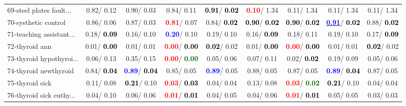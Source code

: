\begin{table}[h]
\begin{center}
\begin{tabular}{lc|c|c|c|c|c|c|c}
69-steel plates fault... &   0.82/  0.12 &   0.90/  0.03 &   0.84/  0.11 & \textcolor{black}{\textbf{  0.91}}/\textcolor{black}{\textbf{  0.02}} & \textcolor{red}{\textbf{  0.10}}/  1.34 &   0.11/  1.34 &   0.11/  1.34 &   0.11/  1.34 \\
70-systhetic control &   0.86/  0.06 &   0.87/  0.03 & \textcolor{red}{\textbf{  0.81}}/  0.07 &   0.84/\textcolor{black}{\textbf{  0.02}} & \textcolor{black}{\textbf{  0.90}}/\textcolor{black}{\textbf{  0.02}} & \textcolor{black}{\textbf{  0.90}}/\textcolor{black}{\textbf{  0.02}} & \underline{\textcolor{blue}{\textbf{  0.91}}}/\textcolor{black}{\textbf{  0.02}} &   0.88/\textcolor{black}{\textbf{  0.02}} \\
71-teaching assistant... &   0.18/\textcolor{black}{\textbf{  0.09}} &   0.16/  0.10 & \textcolor{blue}{\textbf{  0.20}}/  0.10 &   0.19/  0.10 &   0.16/\textcolor{black}{\textbf{  0.09}} &   0.18/  0.11 &   0.19/  0.10 &   0.17/\textcolor{black}{\textbf{  0.09}} \\ \hline
72-thyroid ann &   0.01/\textcolor{black}{\textbf{  0.00}} &   0.01/  0.01 & \textcolor{red}{\textbf{  0.00}}/\textcolor{black}{\textbf{  0.00}} & \textcolor{black}{\textbf{  0.02}}/  0.02 &   0.01/\textcolor{black}{\textbf{  0.00}} & \textcolor{red}{\textbf{  0.00}}/\textcolor{black}{\textbf{  0.00}} &   0.01/  0.01 & \textcolor{black}{\textbf{  0.02}}/  0.02 \\
73-thyroid hypothyroi... &   0.06/  0.13 &   0.35/  0.15 & \textcolor{red}{\textbf{  0.00}}/\textcolor{darkgreen}{\textbf{  0.00}} &   0.05/  0.06 &   0.07/  0.11 &   0.02/\textcolor{black}{\textbf{  0.02}} &   0.19/  0.09 &   0.05/  0.06 \\
74-thyroid newthyroid &   0.84/\textcolor{black}{\textbf{  0.04}} & \textcolor{blue}{\textbf{  0.89}}/\textcolor{black}{\textbf{  0.04}} &   0.85/  0.05 & \textcolor{blue}{\textbf{  0.89}}/  0.05 &   0.88/  0.05 &   0.87/  0.05 & \textcolor{blue}{\textbf{  0.89}}/\textcolor{black}{\textbf{  0.04}} &   0.87/  0.05 \\
75-thyroid sick &   0.11/  0.08 & \textcolor{black}{\textbf{  0.21}}/  0.10 & \textcolor{red}{\textbf{  0.03}}/\textcolor{black}{\textbf{  0.03}} &   0.04/  0.04 &   0.13/  0.08 & \textcolor{red}{\textbf{  0.03}}/\textcolor{darkgreen}{\textbf{  0.02}} & \textcolor{black}{\textbf{  0.21}}/  0.10 &   0.04/  0.04 \\
76-thyroid sick euthy... &   0.04/  0.10 &   0.06/  0.06 & \textcolor{red}{\textbf{  0.01}}/\textcolor{black}{\textbf{  0.01}} &   0.04/  0.05 &   0.04/  0.06 & \textcolor{red}{\textbf{  0.01}}/\textcolor{black}{\textbf{  0.01}} &   0.05/  0.05 &   0.03/  0.03 \\

\end{tabular}
\end{center}
\end{table}
